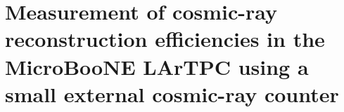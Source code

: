 
\chapter{Measurement of cosmic-ray reconstruction efficiencies in the MicroBooNE LArTPC using a small external cosmic-ray counter}


